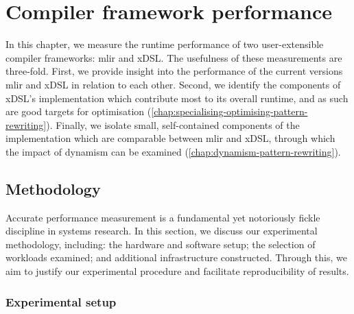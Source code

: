 \chapter{Compiler framework performance}
\label{chap:measuring-compiler-performance}

In this chapter, we measure the runtime performance of two user-extensible compiler frameworks: \ac{mlir} and xDSL.
The usefulness of these measurements are three-fold. First, we provide insight into the performance of the current versions \ac{mlir} and xDSL in relation to each other. %
Second, we identify the components of xDSL's implementation which contribute most to its overall runtime, and as such are good targets for optimisation (\autoref{chap:specialising-optimising-pattern-rewriting}).
Finally, we isolate small, self-contained components of the implementation which are comparable between \ac{mlir} and xDSL, through which the impact of dynamism can be examined (\autoref{chap:dynamism-pattern-rewriting}).



\section{Methodology}
\label{sec:methodology}

Accurate performance measurement is a fundamental yet notoriously fickle discipline in systems research.
In this section, we discuss our experimental methodology, including: the hardware and software setup; the selection of workloads examined; and additional infrastructure constructed.
Through this, we aim to justify our experimental procedure and facilitate reproducibility of results.

\subsection{Experimental setup}
\label{ssec:experimental-setup}

